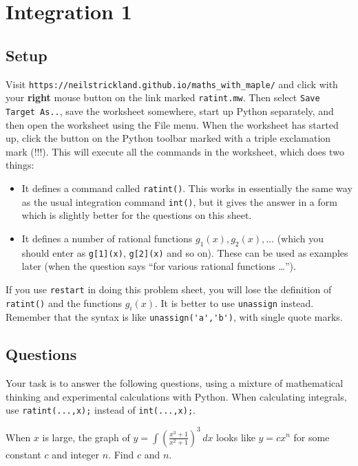 \documentclass[a4paper,10pt]{amsbook}
\begin{document}
\chapter{Integration 1}

\section*{Setup}

Visit \verb~https://neilstrickland.github.io/maths_with_maple/~ and
click with your \textbf{right} mouse button on the link marked
\verb~ratint.mw~.  Then select \verb~Save Target As..~, save the
worksheet somewhere, start up Python separately, and then open the
worksheet using the File menu.  When the worksheet has started up,
click the button on the Python toolbar marked with a triple exclamation
mark (!!!).  This will execute all the commands in the worksheet,
which does two things:
\begin{itemize}
 \item[(a)] It defines a command called \verb~ratint()~.
  This works in essentially the same way as the usual
  integration command \verb~int()~, but it gives the answer
  in a form which is slightly better for the questions on
  this sheet.
 \item[(b)] It defines a number of rational functions
  $g_1(x),g_2(x),\dotsc$ (which you should enter as
  \verb~g[1](x)~, \verb~g[2](x)~ and so on).  These can be
  used as examples later (when the question says ``for
  various rational functions \ldots'').
\end{itemize}
If you use \verb~restart~ in doing this problem sheet, you
will lose the definition of \verb~ratint()~ and the
functions $g_i(x)$.  It is better to use \verb~unassign~
instead.  Remember that the syntax is like
\verb~unassign('a','b')~, with single quote marks.

\section*{Questions}

Your task is to answer the following questions, using a
mixture of mathematical thinking and experimental
calculations with Python.  When calculating integrals, use
\verb~ratint(...,x);~ instead of \verb~int(...,x);~.

\begin{exercise}
 When $x$ is large, the graph of
 $y=\displaystyle\int\left(\frac{x^3+1}{x^2+1}\right)^3\,dx$
 looks like $y=cx^n$ for some constant $c$ and integer $n$.
 Find $c$ and $n$.
\end{exercise}
\end{document}
